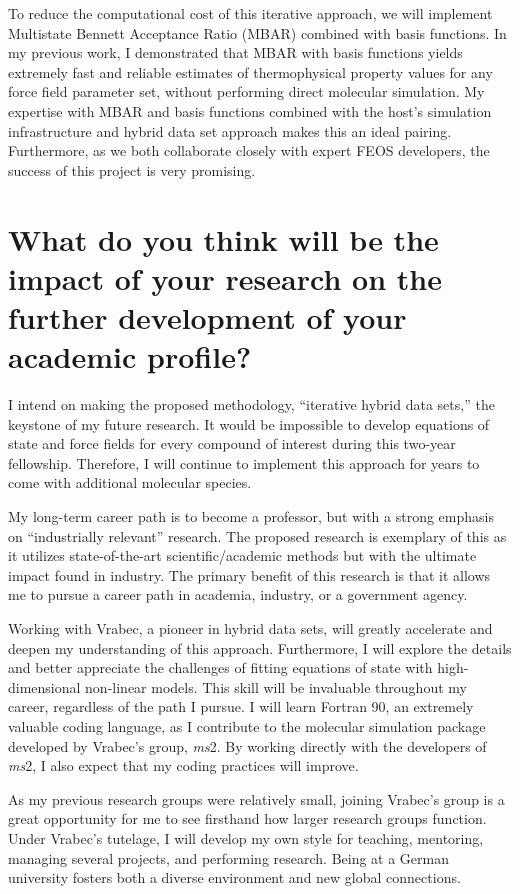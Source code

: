 \documentclass[12pt]{article}
\begin{document}
	To reduce the computational cost of this iterative approach, we will implement Multistate Bennett Acceptance Ratio (MBAR) combined with basis functions. In my previous work, I demonstrated that MBAR with basis functions yields extremely fast and reliable estimates of thermophysical property values for any force field parameter set, without performing direct molecular simulation. My expertise with MBAR and basis functions combined with the host's simulation infrastructure and hybrid data set approach makes this an ideal pairing. Furthermore, as we both collaborate closely with expert FEOS developers, the success of this project is very promising.
	
	\section*{What do you think will be the impact of your research on the further development of your academic profile?}
	
	I intend on making the proposed methodology, ``iterative hybrid data sets,'' the keystone of my future research. It would be impossible to develop equations of state and force fields for every compound of interest during this two-year fellowship. Therefore, I will continue to implement this approach for years to come with additional molecular species.
	
	My long-term career path is to become a professor, but with a strong emphasis on ``industrially relevant'' research. The proposed research is exemplary of this as it utilizes state-of-the-art scientific/academic methods but with the ultimate impact found in industry. The primary benefit of this research is that it allows me to pursue a career path in academia, industry, or a government agency.
	
	Working with Vrabec, a pioneer in hybrid data sets, will greatly accelerate and deepen my understanding of this approach. Furthermore, I will explore the details and better appreciate the challenges of fitting equations of state with high-dimensional non-linear models. This skill will be invaluable throughout my career, regardless of the path I pursue. I will learn Fortran 90, an extremely valuable coding language, as I contribute to the molecular simulation package developed by Vrabec's group, \textit{ms}2. By working directly with the developers of \textit{ms}2, I also expect that my coding practices will improve.
	
	As my previous research groups were relatively small, joining Vrabec's group is a great opportunity for me to see firsthand how larger research groups function. Under Vrabec's tutelage, I will develop my own style for teaching, mentoring, managing several projects, and performing research. Being at a German university fosters both a diverse environment and new global connections.
		
\end{document}
